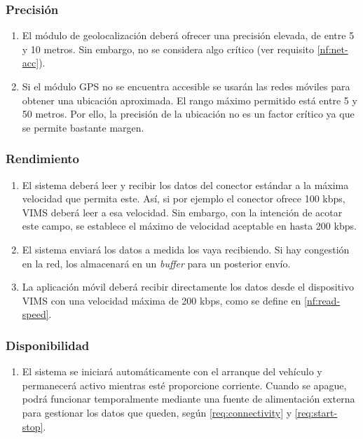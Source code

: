\subsubsection{Precisión}
\begin{enumerate}[label=\textbf{\texttt{RNF-\arabic*}}]
  \item\label{nf:accuracy} El módulo de geolocalización deberá ofrecer una precisión elevada,
  de entre 5 y 10 metros. Sin embargo, no se considera algo crítico (ver requisito
  \ref{nf:net-acc}).
  \item\label{nf:net-acc} Si el
  módulo \ac{GPS} no se encuentra accesible se usarán las redes móviles para
  obtener una ubicación aproximada. El rango máximo permitido está
  entre 5 y 50 metros. Por ello, la precisión de la ubicación no es un factor
  crítico ya que se permite bastante margen.
\end{enumerate}

\subsubsection{Rendimiento}
\begin{enumerate}[resume, label=\textbf{\texttt{RNF-\arabic*}}]
  \item\label{nf:read-speed} El sistema deberá leer y recibir los datos del
  conector estándar a la máxima velocidad que permita este. Así, si por
  ejemplo el conector ofrece 100 kbps, \ac{VIMS} deberá leer a esa velocidad.
  Sin embargo, con la intención de acotar este campo, se establece el máximo
  de velocidad aceptable en hasta 200 kbps.
  \item\label{nf:transmission-speed} El sistema enviará los datos a medida los
  vaya recibiendo. Si hay congestión en la red, los almacenará en un \textit{buffer}
  para un posterior envío.
  \item\label{nf:rt-viewer} La aplicación móvil deberá recibir directamente los
  datos desde el dispositivo \ac{VIMS} con una velocidad máxima de 200 kbps, como
  se define en \ref{nf:read-speed}.
\end{enumerate}

\subsubsection{Disponibilidad}
\begin{enumerate}[resume, label=\textbf{\texttt{RNF-\arabic*}}]
  \item\label{nf:start} El sistema se iniciará automáticamente con el arranque
  del vehículo y permanecerá activo mientras esté proporcione corriente. Cuando
  se apague, podrá funcionar temporalmente mediante una fuente de alimentación
  externa para gestionar los datos que queden, según \ref{req:connectivity} y
  \ref{req:start-stop}.
\end{enumerate}


